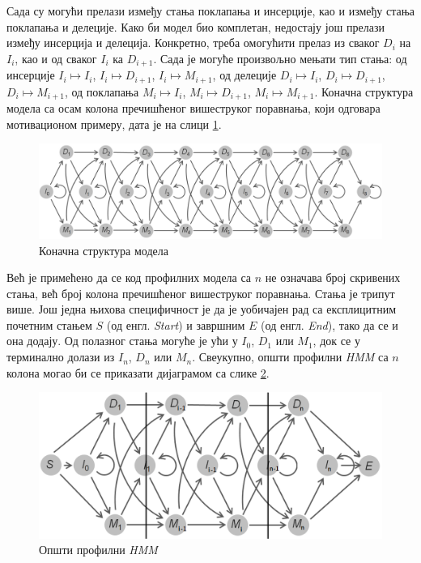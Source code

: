 \documentclass[12pt,oneside]{memoir}
\begin{document}
\begin{CJK}{UTF8}{ipxm}
Сада су могући прелази између стања поклапања и инсерције, као и између стања поклапања и делеције. Како би модел био комплетан, недостају још прелази између инсерција и делеција. Конкретно, треба омогућити прелаз из сваког $D_i$ на $I_i$, као и од сваког $I_i$ ка $D_{i+1}$. Сада је могуће произвољно мењати тип стања: од инсерције $I_i \mapsto I_i$, $I_i \mapsto D_{i+1}$, $I_i \mapsto M_{i+1}$, од делеције $D_i \mapsto I_i$, $D_i \mapsto D_{i+1}$, $D_i \mapsto M_{i+1}$, од поклапања $M_i \mapsto I_i$, $M_i \mapsto D_{i+1}$, $M_i \mapsto M_{i+1}$. Коначна структура модела са осам колона пречишћеног вишеструког поравнања, који одговара мотивационом примеру, дата је на слици \ref{fig:indeli}.

\begin{figure}[H]
  \centering
  \includegraphics[width=\textwidth]{indeli.png}
  \caption{Коначна структура модела \cite{compeau2015}}
  \label{fig:indeli}
\end{figure}

Већ је примећено да се код профилних модела са $n$ не означава број скривених стања, већ број колона пречишћеног вишеструког поравнања. Стања је трипут више. Још једна њихова специфичност је да је уобичајен рад са експлицитним почетним стањем $S$ (од енгл. \textit{Start}) и завршним $E$ (од енгл. \textit{End}), тако да се и она додају. Од полазног стања могуће је ући у $I_0$, $D_1$ или $M_1$, док се у терминално долази из $I_n$, $D_n$ или $M_n$. Свеукупно, општи профилни \textit{HMM} са $n$ колона могао би се приказати дијаграмом са слике \ref{fig:prof_hmm}.

\begin{figure}[H]
  \centering
  \includegraphics[width=.95\textwidth]{prof_hmm.png}
  \caption{Општи профилни \textit{HMM}}
  \label{fig:prof_hmm}
\end{figure}


\end{CJK}
\end{document}
